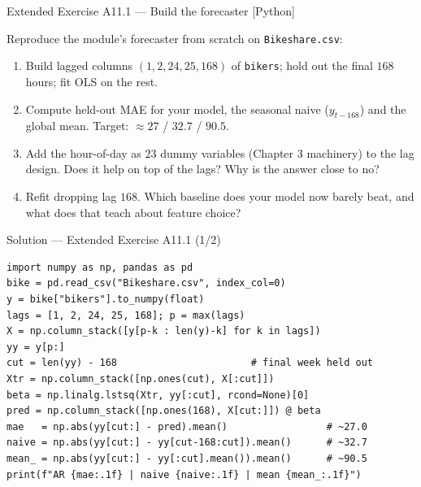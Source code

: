 \documentclass[aspectratio=169,11pt]{beamer}
\begin{document}
\begin{frame}{Extended Exercise A11.1 --- Build the forecaster [Python]}
  \begin{longexercise}
    Reproduce the module's forecaster from scratch on \texttt{Bikeshare.csv}:
    \begin{enumerate}
      \item Build lagged columns $(1, 2, 24, 25, 168)$ of \texttt{bikers}; hold out
            the final $168$ hours; fit OLS on the rest.
      \item Compute held-out MAE for your model, the seasonal naive
            ($y_{t-168}$) and the global mean. Target: $\approx 27$ / $32.7$ /
            $90.5$.
      \item Add the hour-of-day as $23$ dummy variables (Chapter 3 machinery) to
            the lag design. Does it help on top of the lags? Why is the answer
            close to no?
      \item Refit dropping lag $168$. Which baseline does your model now barely
            beat, and what does that teach about feature choice?
    \end{enumerate}
  \end{longexercise}
\end{frame}

\begin{frame}[fragile]{Solution --- Extended Exercise A11.1 (1/2)}
  \begin{solutionbox}
\begin{lstlisting}
import numpy as np, pandas as pd
bike = pd.read_csv("Bikeshare.csv", index_col=0)
y = bike["bikers"].to_numpy(float)
lags = [1, 2, 24, 25, 168]; p = max(lags)
X = np.column_stack([y[p-k : len(y)-k] for k in lags])
yy = y[p:]
cut = len(yy) - 168                       # final week held out
Xtr = np.column_stack([np.ones(cut), X[:cut]])
beta = np.linalg.lstsq(Xtr, yy[:cut], rcond=None)[0]
pred = np.column_stack([np.ones(168), X[cut:]]) @ beta
mae   = np.abs(yy[cut:] - pred).mean()                 # ~27.0
naive = np.abs(yy[cut:] - yy[cut-168:cut]).mean()      # ~32.7
mean_ = np.abs(yy[cut:] - yy[:cut].mean()).mean()      # ~90.5
print(f"AR {mae:.1f} | naive {naive:.1f} | mean {mean_:.1f}")
\end{lstlisting}
  \end{solutionbox}
\end{frame}
\end{document}
